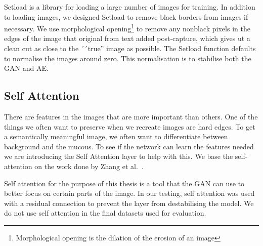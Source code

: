 Setload is a library for loading a large number of images for training. In addition to loading images, we designed Setload to remove black borders from images if necessary. 
We use morphological opening\footnote{Morphological opening is the dilation of the erosion of an image } to remove any nonblack pixels in the edges of the image that original from text added post-capture, which gives ut a clean cut as close to the ´´true'' image as possible. The Setload function defaults to normalise the images around zero. This normalisation is to stabilise both the GAN and AE.


\subsection{Self Attention}
\label{cha:attention}
There are features in the images that are more important than others. One of the things we often want to preserve when we recreate images are hard edges. To get a semantically meaningful image,  we often want to differentiate between background and the mucous. 
To see if the network can learn the features needed we are introducing the Self Attention layer to help with this. We base the self-attention on the work done by Zhang et al.~\cite{DBLP:journals/corr/selfattention}.

Self attention for the purpose of this thesis is a tool that the GAN can use to better focus on certain parts of the image. 
In our testing, self attention was used with a residual connection to prevent the layer from destabilising the model. We do not use self attention in the final datasets used for evaluation.

%


